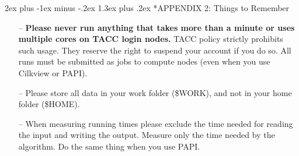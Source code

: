 \documentclass[11pt]{article}
\makeatletter
\renewcommand{\section}{\@startsection{section}{1}{0mm}%
                                   {2ex plus -1ex minus -.2ex}%
                                   {1.3ex plus .2ex}%
                                   {\normalfont\Large\bfseries}}%
\makeatother
\begin{document}
\section*{APPENDIX 2: Things to Remember}
%
 \begin{itemize}
%
\vspace{-0.1cm}
 \item[--] {\bf Please never run anything that takes more than a minute or uses multiple cores on TACC login nodes.}
          TACC policy strictly prohibits such usage. They reserve the right to suspend your account if you
          do so. All runs must be submitted as jobs to compute nodes (even when you use Cilkview or PAPI).
%
\vspace{-0.1cm}
 \item[--] Please store all data in your work folder (\$WORK), and not in your home folder (\$HOME).
%
\vspace{-0.1cm}
 \item[--] When measuring running times please exclude the time needed for reading the input and writing
          the output. Measure only the time needed by the algorithm. Do the same thing when you
          use PAPI.
%
 \end{itemize}
\end{document}
